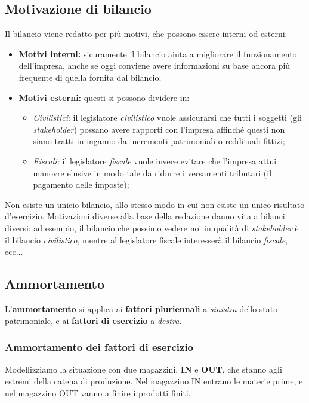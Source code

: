 \documentclass[a4paper,11pt]{article}
\begin{document}
\subsection{Motivazione di bilancio}
Il bilancio viene redatto per più motivi, che possono essere interni od esterni:
\begin{itemize}
	\item \textbf{Motivi interni:} sicuramente il bilancio aiuta a migliorare il funzionamento dell'impresa, anche se oggi conviene avere informazioni su base ancora più frequente di quella fornita dal bilancio;

	\item \textbf{Motivi esterni:} questi si possono dividere in:
		\begin{itemize}
			\item \textit{Civilistici}: il legislatore \textit{civilistico} vuole assicurarsi che tutti i soggetti (gli \textit{stakeholder}) possano avere rapporti con l'impresa affinché questi non siano tratti in inganno da incrementi patrimoniali o reddituali fittizi;

			\item \textit{Fiscali:} il legislatore \textit{fiscale} vuole invece evitare che l'impresa attui manovre elusive in modo tale da ridurre i versamenti tributari (il pagamento delle imposte);
		\end{itemize}
\end{itemize}

Non esiste un unicio bilancio, allo stesso modo in cui non esiste un unico risultato d'esercizio.
Motivazioni diverse alla base della redazione danno vita a bilanci diversi: ad esempio, il bilancio che possimo vedere noi in qualità di \textit{stakeholder} è il bilancio \textit{civilistico}, mentre al legislatore fiscale interesserà il bilancio \textit{fiscale}, ecc...

\subsection{Ammortamento}
L'\textbf{ammortamento} si applica ai \textbf{fattori pluriennali} a \textit{sinistra} dello stato patrimoniale, e ai \textbf{fattori di esercizio} a \textit{destra}.

\subsubsection{Ammortamento dei fattori di esercizio}
 Modellizziamo la situazione con due magazzini, \textbf{IN} e \textbf{OUT}, che stanno agli estremi della catena di produzione.
Nel magazzino IN entrano le materie prime, e nel magazzino OUT vanno a finire i prodotti finiti.
\end{document}
